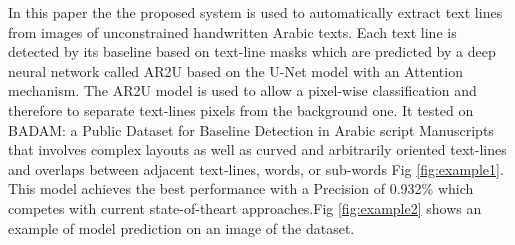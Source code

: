 In this paper \cite{9257759} the
the proposed system is used  to automatically extract text lines from images of unconstrained handwritten Arabic texts. Each text line is detected by its baseline based on text-line masks which are predicted by a deep neural network called \acrshort{AR2U} based on the U-Net model with an Attention mechanism. The \acrshort{AR2U} model is used to allow a pixel-wise classification and therefore to separate text-lines pixels from the background one.
It tested on BADAM: a Public Dataset for
Baseline Detection in Arabic script Manuscripts that involves complex layouts as well as curved and arbitrarily oriented text-lines and overlaps between adjacent text-lines, words, or sub-words  Fig \ref{fig:example1}.\\ 

This model achieves the best performance with a Precision of 0.932\% which competes with current state-of-theart approaches.Fig \ref{fig:example2} shows an example of model prediction on an image
of the dataset.

